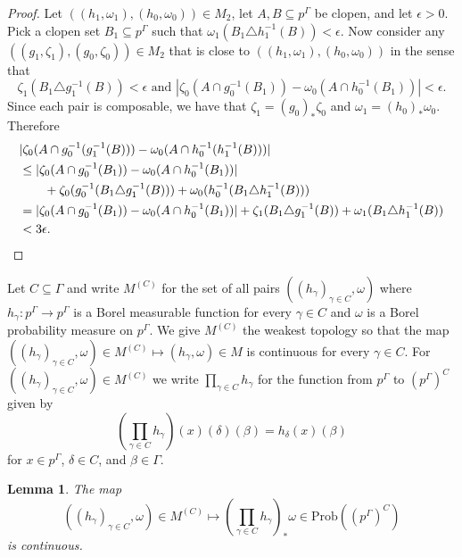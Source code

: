 \documentclass[12pt]{amsart}
\newtheorem{lem}[thm]{Lemma}
\theoremstyle{definition}
\newcommand{\symd}{\triangle}
\newcommand{\Prob}{\mathrm{Prob}}
\begin{document}
\begin{proof}
	Let $((h_1, \omega_1), (h_0, \omega_0)) \in M_2$, let $A, B \subseteq p^\Gamma$ be clopen, and let $\epsilon > 0$. Pick a clopen set $B_1 \subseteq p^\Gamma$ such that $\omega_1(B_1 \symd h_1^{-1}(B)) < \epsilon$. Now consider any $((g_1, \zeta_1),(g_0,\zeta_0)) \in M_2$ that is close to $((h_1, \omega_1), (h_0, \omega_0))$ in the sense that
	\[\zeta_1(B_1 \symd g_1^{-1}(B)) < \epsilon \text{ and } |\zeta_0(A \cap g_0^{-1}(B_1)) - \omega_0(A \cap h_0^{-1}(B_1))| < \epsilon.\]
	Since each pair is composable, we have that $\zeta_1 = (g_0)_* \zeta_0$ and $\omega_1 = (h_0)_* \omega_0$. Therefore
	\begin{align*}
		& |\zeta_0(A \cap g_0^{-1}(g_1^{-1}(B))) - \omega_0(A \cap h_0^{-1}(h_1^{-1}(B)))|\\
		& \leq |\zeta_0(A \cap g_0^{-1}(B_1))-\omega_0(A \cap h_0^{-1}(B_1))|\\
		& \qquad + \zeta_0(g_0^{-1}(B_1 \symd g_1^{-1}(B)))+\omega_0(h_0^{-1}(B_1 \symd h_1^{-1}(B)))\\
		& = |\zeta_0(A \cap g_0^{-1}(B_1))-\omega_0(A \cap h_0^{-1}(B_1))|+\zeta_1(B_1 \symd g_1^{-1}(B)) + \omega_1(B_1 \symd h_1^{-1}(B))\\
		& < 3 \epsilon.\qedhere
	\end{align*}
\end{proof}

Let $C \subseteq \Gamma$ and write $M^{(C)}$ for the set of all pairs $((h_\gamma)_{\gamma \in C}, \omega)$ where $h_\gamma : p^\Gamma \rightarrow p^\Gamma$ is a Borel measurable function for every $\gamma \in C$ and $\omega$ is a Borel probability measure on $p^\Gamma$. We give $M^{(C)}$ the weakest topology so that the map $((h_\gamma)_{\gamma \in C}, \omega) \in M^{(C)} \mapsto (h_\gamma, \omega) \in M$ is continuous for every $\gamma \in C$. For $((h_\gamma)_{\gamma \in C}, \omega) \in M^{(C)}$ we write $\prod_{\gamma \in C} h_\gamma$ for the function from $p^\Gamma$ to $(p^\Gamma)^C$ given by $$(\prod_{\gamma \in C} h_\gamma)(x)(\delta)(\beta) = h_\delta(x)(\beta)$$ for $x \in p^\Gamma$, $\delta \in C$, and $\beta \in \Gamma$.

\begin{lem} \label{lem:mfold}
	The map
	\[((h_\gamma)_{\gamma \in C}, \omega) \in M^{(C)} \mapsto \left(\prod_{\gamma \in C} h_\gamma \right)_* \omega \in \Prob((p^\Gamma)^C)\]
	is continuous.
\end{lem}
\end{document}
